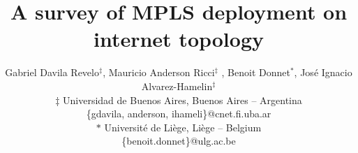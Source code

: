 \documentclass[conference]{IEEEtran} %
\begin{document}
\title{	A survey of MPLS deployment on internet topology} %
\author{Gabriel Davila Revelo{$^{\ddag}$}, Mauricio Anderson Ricci{$^{\ddag}$} , Benoit Donnet{$^{\ast}$},
Jos\'e Ignacio Alvarez-Hamelin{$^{\ddag}$}\\
$\ddag$ Universidad de Buenos Aires, Buenos Aires -- Argentina\\ 
\{gdavila, anderson, ihameli\}@cnet.fi.uba.ar \\
$\ast$ Universit\'e de Li\`ege, Li\`ege -- Belgium\\
\{benoit.donnet\}@ulg.ac.be
}

\maketitle











{\small
 
 
}
\end{document}
